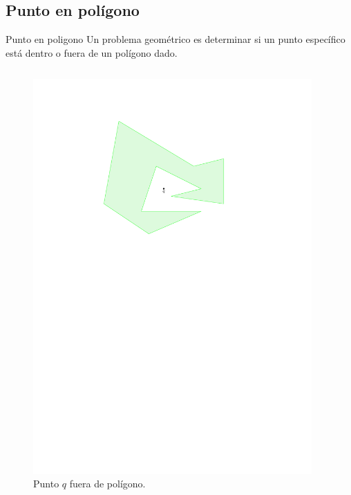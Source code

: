 \documentclass[aspectratio=169,xcolor=dvipsnames, t]{beamer}
\begin{document}
\subsection{Punto en polígono}
\begin{frame}[c]{Punto en poligono}
  Un problema geométrico es determinar si un punto específico está dentro o fuera de un polígono dado.
  \begin{columns}
    \begin{column}{0.45\textwidth}
      \begin{figure}
        \centering
        \includegraphics[width=\linewidth, height=0.5\textheight, page=1, keepaspectratio]{IPE/pip.pdf}
        \caption{Punto $q$ fuera de polígono.}
      \end{figure}
    \end{column}
    \begin{column}{0.45\textwidth}

\end{column}
\end{columns}
\end{frame}
\end{document}
